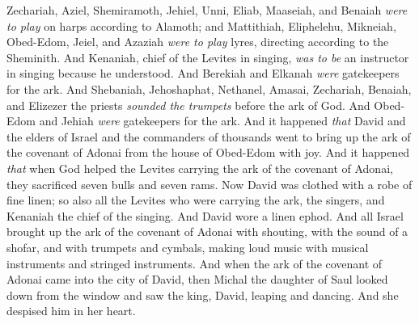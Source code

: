 \begin{biblechapter}
\verse Zechariah, Aziel, Shemiramoth, Jehiel, Unni, Eliab, Maaseiah, and Benaiah \textit{were to play} on harps according to Alamoth;
\verse and Mattithiah, Eliphelehu, Mikneiah, Obed-Edom, Jeiel, and Azaziah \textit{were to play} lyres, directing according to the Sheminith.
\verse And Kenaniah, chief of the Levites in singing, \textit{was to be} an instructor in singing because he understood.
\verse And Berekiah and Elkanah \textit{were} gatekeepers for the ark.
\verse And Shebaniah, Jehoshaphat, Nethanel, Amasai, Zechariah, Benaiah, and Elizezer the priests \textit{sounded the trumpets} before the ark of God. And Obed-Edom and Jehiah \textit{were} gatekeepers for the ark.
\verse And it happened \textit{that} David and the elders of Israel and the commanders of thousands went to bring up the ark of the covenant of Adonai from the house of Obed-Edom with joy.
\verse And it happened \textit{that} when God helped the Levites carrying the ark of the covenant of Adonai, they sacrificed seven bulls and seven rams.
\verse Now David was clothed with a robe of fine linen; so also all the Levites who were carrying the ark, the singers, and Kenaniah the chief of the singing. And David wore a linen ephod.
\verse And all Israel brought up the ark of the covenant of Adonai with shouting, with the sound of a shofar, and with trumpets and cymbals, making loud music with musical instruments and stringed instruments.
\verse And when the ark of the covenant of Adonai came into the city of David, then Michal the daughter of Saul looked down from the window and saw the king, David, leaping and dancing. And she despised him in her heart.
\end{biblechapter}

